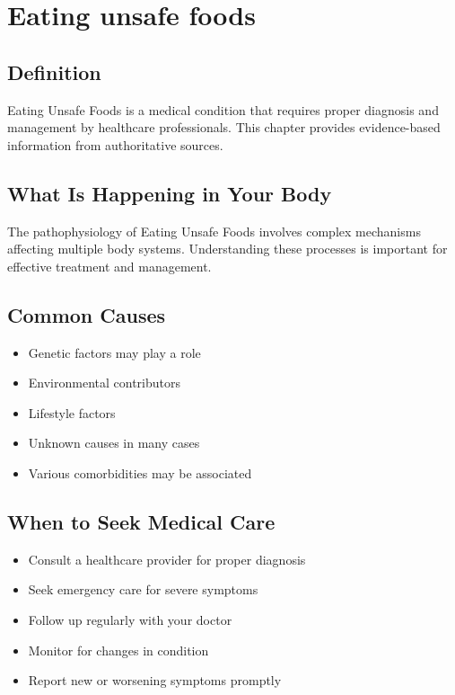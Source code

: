 
\chapter{Eating unsafe foods}

\section*{Definition}
Eating Unsafe Foods is a medical condition that requires proper diagnosis and management by healthcare professionals. This chapter provides evidence-based information from authoritative sources.

\section*{What Is Happening in Your Body}
The pathophysiology of Eating Unsafe Foods involves complex mechanisms affecting multiple body systems. Understanding these processes is important for effective treatment and management.

\section*{Common Causes}
\begin{itemize}
  \item Genetic factors may play a role
  \item Environmental contributors
  \item Lifestyle factors
  \item Unknown causes in many cases
  \item Various comorbidities may be associated
\end{itemize}

\section*{When to Seek Medical Care}
\begin{itemize}
  \item Consult a healthcare provider for proper diagnosis
  \item Seek emergency care for severe symptoms
  \item Follow up regularly with your doctor
  \item Monitor for changes in condition
  \item Report new or worsening symptoms promptly
\end{itemize}

